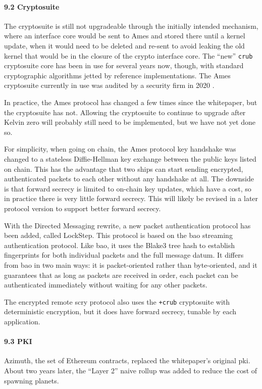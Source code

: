 \documentclass[twoside]{article}
\begin{document}
\paragraph{9.2 Cryptosuite}

The cryptosuite is still not upgradeable through the initially intended mechanism, where an interface core would be sent to Ames and stored there until a kernel update, when it would need to be deleted and re-sent to avoid leaking the old kernel that would be in the closure of the crypto interface core.  The ``new'' \lstinline[style=inlinecode]{crub} cryptosuite core has been in use for several years now, though, with standard cryptographic algorithms jetted by reference implementations.  The Ames cryptosuite currently in use was audited by a security firm in 2020 \citep{AmesAudit}.

In practice, the Ames protocol has changed a few times since the whitepaper, but the cryptosuite has not.  Allowing the cryptosuite to continue to upgrade after Kelvin zero will probably still need to be implemented, but we have not yet done so.

For simplicity, when going on chain, the Ames protocol key handshake was changed to a stateless Diffie-Hellman key exchange between the public keys listed on chain.  This has the advantage that two ships can start sending encrypted, authenticated packets to each other without any handshake at all.  The downside is that forward secrecy is limited to on-chain key updates, which have a cost, so in practice there is very little forward secrecy.  This will likely be revised in a later protocol version to support better forward secrecy.

With the Directed Messaging rewrite, a new packet authentication protocol has been added, called LockStep.  This protocol is based on the {\sc bao} streaming authentication protocol.  Like {\sc bao}, it uses the Blake3 tree hash to establish fingerprints for both individual packets and the full message datum.  It differs from {\sc bao} in two main ways: it is packet-oriented rather than byte-oriented, and it guarantees that as long as packets are received in order, each packet can be authenticated immediately without waiting for any other packets.

The encrypted remote scry protocol also uses the \lstinline[style=inlinecode]{+crub} cryptosuite with deterministic encryption, but it does have forward secrecy, tunable by each application.

\paragraph{9.3 PKI}  Azimuth, the set of Ethereum contracts, replaced the whitepaper's original {\sc pki}.  About two years later, the ``Layer 2'' naive rollup was added to reduce the cost of spawning planets.
\end{document}

